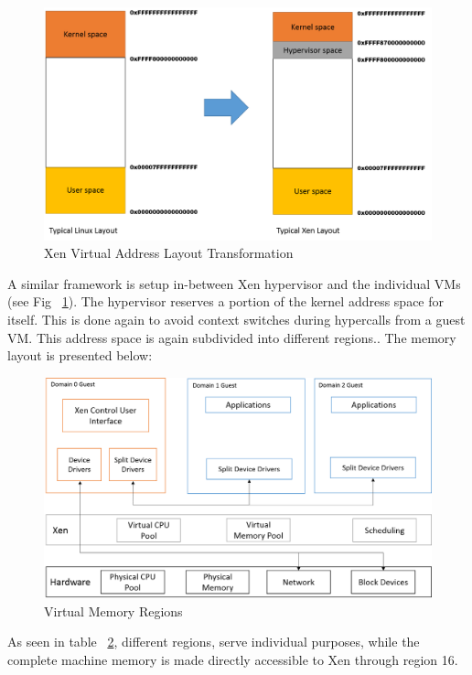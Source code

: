 \begin{figure}[H]
\centering
\includegraphics[scale=0.6]{figures/VA_layout_hypervisor.png}
\caption{Xen Virtual Address Layout Transformation}
\label{fig:xen_layout}
\end{figure}


A similar framework is setup in-between Xen hypervisor and the individual VMs (see Fig ~\ref{fig:xen_layout}). The hypervisor reserves a portion of the kernel address space for itself. This is done again to avoid context switches during hypercalls from a guest VM. This address space is again subdivided into different regions.. The memory layout is presented below: 



\begin{figure}[H]
\centering
\includegraphics[scale=0.6]{figures/Xen_model.png}
\caption{Virtual Memory Regions}
\label{tab:xen_address}
\end{figure}

As seen in table ~\ref{tab:xen_address}, different regions, serve individual purposes, while the complete machine memory is made directly accessible to Xen through region 16. 


